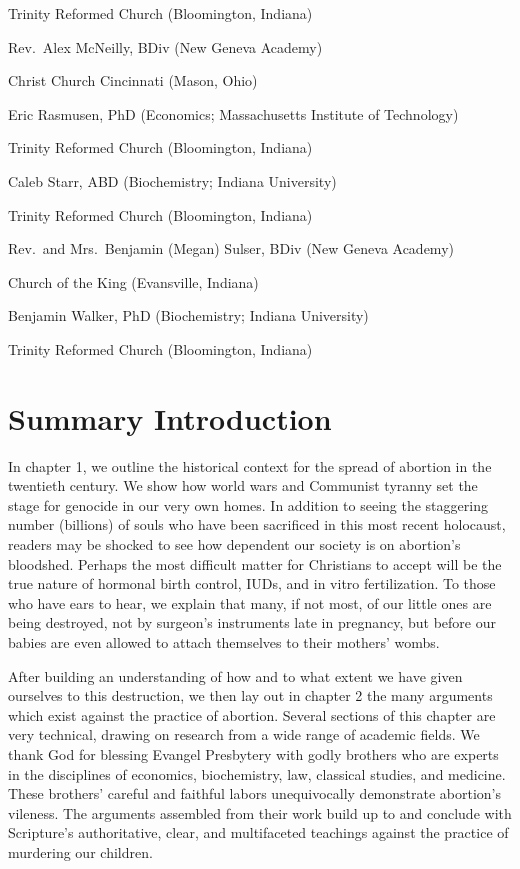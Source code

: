 \documentclass[
]{book}
\begin{document}
Trinity Reformed Church (Bloomington, Indiana)

Rev.~Alex McNeilly, BDiv (New Geneva Academy)

Christ Church Cincinnati (Mason, Ohio)

Eric Rasmusen, PhD (Economics; Massachusetts Institute of Technology)

Trinity Reformed Church (Bloomington, Indiana)

Caleb Starr, ABD (Biochemistry; Indiana University)

Trinity Reformed Church (Bloomington, Indiana)

Rev.~and Mrs.~Benjamin (Megan) Sulser, BDiv (New Geneva Academy)

Church of the King (Evansville, Indiana)

Benjamin Walker, PhD (Biochemistry; Indiana University)

Trinity Reformed Church (Bloomington, Indiana)

\hypertarget{summary-introduction}{%
\chapter{Summary Introduction}\label{summary-introduction}}

In chapter 1, we outline the historical context for the spread of abortion in the twentieth century. We show how world wars and Communist tyranny set the stage for genocide in our very own homes. In addition to seeing the staggering number (billions) of souls who have been sacrificed in this most recent holocaust, readers may be shocked to see how dependent our society is on abortion's bloodshed. Perhaps the most difficult matter for Christians to accept will be the true nature of hormonal birth control, IUDs, and in vitro fertilization. To those who have ears to hear, we explain that many, if not most, of our little ones are being destroyed, not by surgeon's instruments late in pregnancy, but before our babies are even allowed to attach themselves to their mothers' wombs.

After building an understanding of how and to what extent we have given ourselves to this destruction, we then lay out in chapter 2 the many arguments which exist against the practice of abortion. Several sections of this chapter are very technical, drawing on research from a wide range of academic fields. We thank God for blessing Evangel Presbytery with godly brothers who are experts in the disciplines of economics, biochemistry, law, classical studies, and medicine. These brothers' careful and faithful labors unequivocally demonstrate abortion's vileness. The arguments assembled from their work build up to and conclude with Scripture's authoritative, clear, and multifaceted teachings against the practice of murdering our children.
\end{document}
